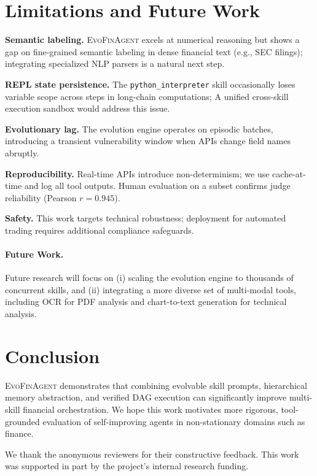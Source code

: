 \documentclass{article}
\begin{document}
\section{Limitations and Future Work}
\label{sec:limitations}

\textbf{Semantic labeling.} \textsc{EvoFinAgent} excels at numerical reasoning but shows a gap on fine-grained semantic labeling in dense financial text (e.g., SEC filings); integrating specialized NLP parsers is a natural next step.

\textbf{REPL state persistence.} The \texttt{python\_interpreter} skill occasionally loses variable scope across steps in long-chain computations; A unified cross-skill execution sandbox would address this issue.

\textbf{Evolutionary lag.} The evolution engine operates on episodic batches, introducing a transient vulnerability window when APIs change field names abruptly.

\textbf{Reproducibility.} Real-time APIs introduce non-determinism; we use cache-at-time and log all tool outputs. Human evaluation on a subset confirms judge reliability (Pearson $r=0.945$).

\textbf{Safety.} This work targets technical robustness; deployment for automated trading requires additional compliance safeguards.

\paragraph{Future Work.}
Future research will focus on (i) scaling the evolution engine to thousands of concurrent skills, and (ii) integrating a more diverse set of multi-modal tools, including OCR for PDF analysis and chart-to-text generation for technical analysis.

\section{Conclusion}
\textsc{EvoFinAgent} demonstrates that combining evolvable skill prompts, hierarchical memory abstraction, and verified DAG execution can significantly improve multi-skill financial orchestration. We hope this work motivates more rigorous, tool-grounded evaluation of self-improving agents in non-stationary domains such as finance.

\begin{ack}
We thank the anonymous reviewers for their constructive feedback. This work was supported in part by the project's internal research funding.
\end{ack}
\end{document}
